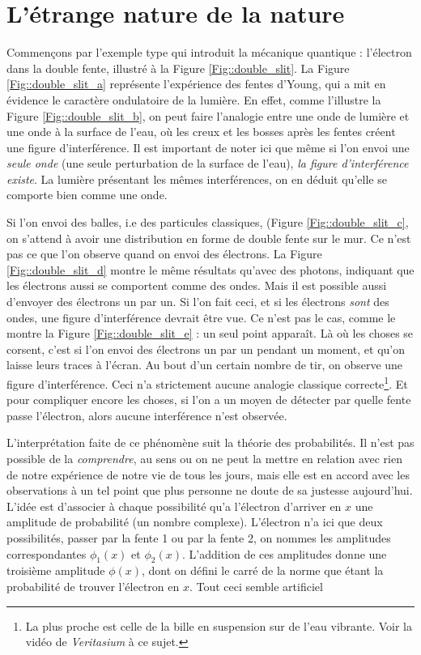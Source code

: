 \section{L'étrange nature de la nature}\label{sec::strange_nature}
    
    Commençons par l'exemple type qui introduit la mécanique quantique : l'électron dans la double fente, illustré à la Figure \ref{Fig::double_slit}. La Figure \ref{Fig::double_slit_a} représente l'expérience des fentes d'Young\cite{young}, qui a mit en évidence le caractère ondulatoire de la lumière. En effet, comme l'illustre la Figure \ref{Fig::double_slit_b}, on peut faire l'analogie entre une onde de lumière et une onde à la surface de l'eau, où les creux et les bosses après les fentes créent une figure d'interférence. Il est important de noter ici que même si l'on envoi une \textit{seule onde} (une seule perturbation de la surface de l'eau), \textit{la figure d'interférence existe}. La lumière présentant les mêmes interférences, on en déduit qu'elle se comporte bien comme une onde.
                    
    Si l'on envoi des balles, i.e des particules classiques, (Figure \ref{Fig::double_slit_c}, on s'attend à avoir une distribution en forme de double fente sur le mur. Ce n'est pas ce que l'on observe quand on envoi des électrons. La Figure \ref{Fig::double_slit_d} montre le même résultats qu'avec des photons\cite{double_slit_electrons}, indiquant que les électrons aussi se comportent comme des ondes. Mais il est possible aussi d'envoyer des électrons un par un. Si l'on fait ceci, et si les électrons \textit{sont} des ondes, une figure d'interférence devrait être vue. Ce n'est pas le cas, comme le montre la Figure \ref{Fig::double_slit_e} : un seul point apparaît. Là où les choses se corsent, c'est si l'on envoi des électrons un par un pendant un moment, et qu'on laisse leurs traces à l'écran. Au bout d'un certain nombre de tir, on observe une figure d'interférence. Ceci n'a strictement aucune analogie classique correcte\footnote{La plus proche est celle de la bille en suspension sur de l'eau vibrante. Voir la vidéo de \textit{Veritasium} à ce sujet\cite{veritasium}.}. Et pour compliquer encore les choses, si l'on a un moyen de détecter par quelle fente passe l'électron, alors aucune interférence n'est observée.
                    
    L'interprétation faite de ce phénomène suit la théorie des probabilités. Il n'est pas possible de la \textit{comprendre}, au sens ou on ne peut la mettre en relation avec rien de notre expérience de notre vie de tous les jours, mais elle est en accord avec les observations à un tel point que plus personne ne doute de sa justesse aujourd'hui. L'idée est d'associer à chaque possibilité qu'a l'électron d'arriver en $x$ une amplitude de probabilité (un nombre complexe). L'électron n'a ici que deux possibilités, passer par la fente 1 ou par la fente 2, on nommes les amplitudes correspondantes $\phi_1(x)$ et $\phi_2(x)$. L'addition de ces amplitudes donne une troisième amplitude $\phi(x)$, dont on défini le carré de la norme que étant la probabilité de trouver l'électron en $x$. Tout ceci semble artificiel